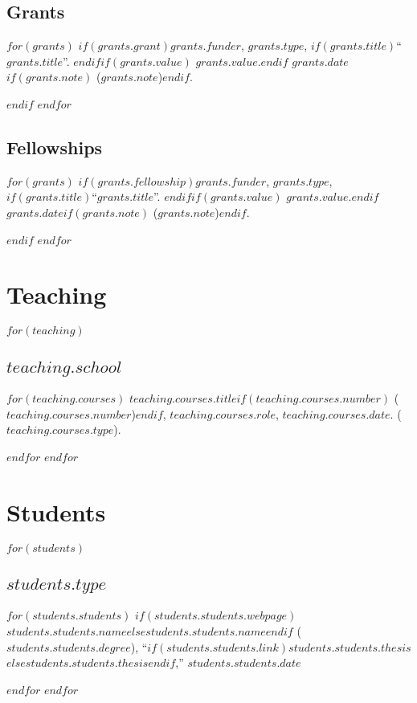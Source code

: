 \documentclass[11pt]{article}
\begin{document}
\subsection{Grants}
$for(grants)$
$if(grants.grant)$\ind \textit{$grants.funder$}, $grants.type$, $if(grants.title)$``$grants.title$''. $endif$$if(grants.value)$ $grants.value$.$endif$ $grants.date$$if(grants.note)$ ($grants.note$)$endif$.

$endif$
$endfor$

\subsection{Fellowships}
$for(grants)$
$if(grants.fellowship)$\ind \textit{$grants.funder$}, $grants.type$, $if(grants.title)$``$grants.title$''. $endif$$if(grants.value)$ $grants.value$.$endif$ $grants.date$$if(grants.note)$ ($grants.note$)$endif$.

$endif$
$endfor$

\section{Teaching}

$for(teaching)$
\subsection{$teaching.school$}
$for(teaching.courses)$
\ind $teaching.courses.title$$if(teaching.courses.number)$ ($teaching.courses.number$)$endif$, $teaching.courses.role$, $teaching.courses.date$. ($teaching.courses.type$).

$endfor$
$endfor$

\section{Students}

$for(students)$
\subsection{$students.type$}
$for(students.students)$
\ind $if(students.students.webpage)$\href{$students.students.webpage$}{$students.students.name$}$else$$students.students.name$$endif$ ($students.students.degree$), ``$if(students.students.link)$\href{$students.students.link$}{$students.students.thesis$}$else$$students.students.thesis$$endif$,'' $students.students.date$

$endfor$
$endfor$
\end{document}
